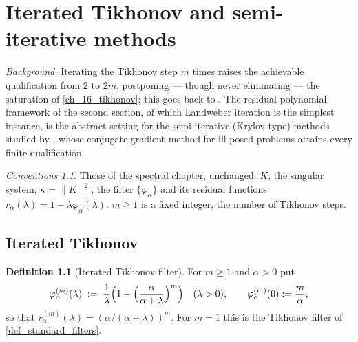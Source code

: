 \documentclass[a4paper]{report}
\theoremstyle{plain}
\theoremstyle{definition}
\newtheorem{definition}[theorem]{Definition}
\theoremstyle{remark}
\newtheorem{assumptions}[theorem]{Conventions}
\begin{document}
\chapter{Iterated Tikhonov and semi-iterative methods}
\label{ch_20_iterated_tikhonov}

\noindent\emph{Background.} Iterating the Tikhonov step $m$ times raises the achievable
qualification from $2$ to $2m$, postponing --- though never eliminating --- the
saturation of \cref{ch_16_tikhonov}; this goes back to
\citet{KingChillingworth1979}. The residual-polynomial framework of the second section,
of which Landweber iteration is the simplest instance, is the abstract setting for the
semi-iterative (Krylov-type) methods studied by \citet{Brakhage1987}, whose
conjugate-gradient method for ill-posed problems attains every finite qualification.

\begin{assumptions}
  \label{asm_iterated_tikhonov_semi}
  Those of the spectral chapter, unchanged: $K$, the
singular system, $\kappa = \|K\|^{2}$, the filter $\{\varphi_{\alpha}\}$ and its residual
functions $r_{\alpha}(\lambda) = 1 - \lambda\varphi_{\alpha}(\lambda)$.  $m \ge 1$ is a
fixed integer, the number of Tikhonov steps.
\end{assumptions}

\section{Iterated Tikhonov}

\begin{definition}[Iterated Tikhonov filter]
  \label{def_iterated_tikhonov}
  For $m \ge 1$ and $\alpha > 0$ put
  \[
    \varphi^{(m)}_{\alpha}(\lambda) \;:=\;
      \frac{1}{\lambda}\Bigl(1 - \Bigl(\frac{\alpha}{\alpha+\lambda}\Bigr)^{m}\Bigr)
      \quad (\lambda > 0),
    \qquad \varphi^{(m)}_{\alpha}(0) := \frac{m}{\alpha} ,
  \]
  so that $r^{(m)}_{\alpha}(\lambda) = (\alpha/(\alpha+\lambda))^{m}$.  For $m = 1$ this
  is the Tikhonov filter of \cref{def_standard_filters}.
\end{definition}
\end{document}
